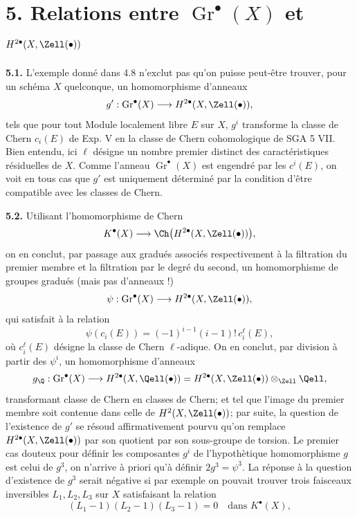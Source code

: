 \section*{5. Relations entre \(\operatorname{Gr}^\bullet(X)\) et \(H^{2\bullet}(X,\Zell(\bullet))\)}

\textbf{5.1.} L'exemple donné dans 4.8 n'exclut pas qu'on puisse peut-être trouver, pour un schéma $X$ quelconque, un homomorphisme d'anneaux
\[
 g':\operatorname{Gr}^\bullet(X)\longrightarrow H^{2\bullet}(X,\Zell(\bullet)),
\]
tels que pour tout Module localement libre $E$ sur $X$, $g^i$ transforme la classe de Chern $c_i(E)$ de Exp. V en la classe de Chern cohomologique de SGA 5 VII. Bien entendu, ici $\ell$ désigne un nombre premier distinct des caractéristiques résiduelles de $X$. Comme l'anneau $\operatorname{Gr}^\bullet(X)$ est engendré par les $c^i(E)$, on voit en tous cas que $g'$ est uniquement déterminé par la condition d'être compatible avec les classes de Chern.

\textbf{5.2.} Utilisant l'homomorphisme de Chern
\[
 K^\bullet(X)\longrightarrow\Ch\bigl(H^{2\bullet}(X,\Zell(\bullet))\bigr),
\]
on en conclut, par passage aux gradués associés respectivement à la filtration du premier membre et la filtration par le degré du second, un homomorphisme de groupes gradués (mais pas d'anneaux !)
\[
 \psi:\operatorname{Gr}^\bullet(X)\longrightarrow H^{2\bullet}(X,\Zell(\bullet)),
\]
qui satisfait à la relation
\[
 \psi(c_i(E))=(-1)^{i-1}(i-1)!\,c_i^\ell(E),
\]
où $c_i^\ell(E)$ désigne la classe de Chern $\ell$-adique. On en conclut, par division à partir des $\psi^i$, un homomorphisme d'anneaux
\[
 g_\Q:\operatorname{Gr}^\bullet(X)\longrightarrow
 H^{2\bullet}(X,\Qell(\bullet))=
 H^{2\bullet}(X,\Zell(\bullet))\otimes_{\Zell}\Qell,
\]
transformant classe de Chern en classes de Chern; et tel que l'image du premier membre soit contenue dans celle de $H^2(X,\Zell(\bullet))$; par suite, la question de l'existence de $g'$ se résoud affirmativement pourvu qu'on remplace $H^{2\bullet}(X,\Zell(\bullet))$ par son quotient par son sous-groupe de torsion. Le premier cas douteux pour définir les composantes $g^i$ de l'hypothètique homomorphisme $g$ est celui de $g^3$, on n'arrive à priori qu'à définir $2g^3=\psi^3$. La réponse à la question d'existence de $g^3$ serait négative si par exemple on pouvait trouver trois faisceaux inversibles $L_1,L_2,L_3$ sur $X$ satisfaisant la relation
\[
 (L_1-1)(L_2-1)(L_3-1)=0\quad\text{dans }K^\bullet(X),
\]
